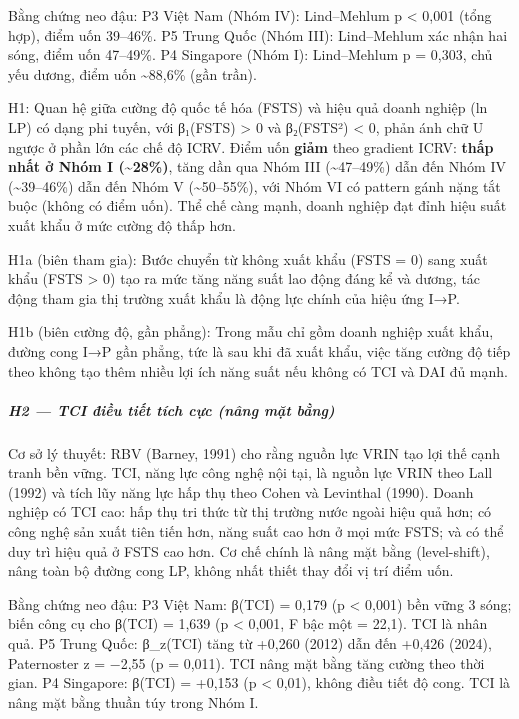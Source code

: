 \documentclass[12pt,a4paper]{article}
\begin{document}
Bằng chứng neo đậu: P3 Việt Nam (Nhóm IV): Lind--Mehlum p \textless{}
0,001 (tổng hợp), điểm uốn 39--46\%. P5 Trung Quốc (Nhóm III):
Lind--Mehlum xác nhận hai sóng, điểm uốn 47--49\%. P4 Singapore (Nhóm
I): Lind--Mehlum p = 0,303, chủ yếu dương, điểm uốn
\textasciitilde88,6\% (gần trần).

H1: Quan hệ giữa cường độ quốc tế hóa (FSTS) và hiệu quả doanh nghiệp
(ln LP) có dạng phi tuyến, với β₁(FSTS) \textgreater{} 0 và β₂(FSTS²)
\textless{} 0, phản ánh chữ U ngược ở phần lớn các chế độ ICRV. Điểm uốn
\textbf{giảm} theo gradient ICRV: \textbf{thấp nhất ở Nhóm I
(\textasciitilde28\%)}, tăng dần qua Nhóm III (\textasciitilde47--49\%)
dẫn đến Nhóm IV (\textasciitilde39--46\%) dẫn đến Nhóm V
(\textasciitilde50--55\%), với Nhóm VI có pattern gánh nặng tắt buộc
(không có điểm uốn). Thể chế càng mạnh, doanh nghiệp đạt đỉnh hiệu suất
xuất khẩu ở mức cường độ thấp hơn.

H1a (biên tham gia): Bước chuyển từ không xuất khẩu (FSTS = 0) sang xuất
khẩu (FSTS \textgreater{} 0) tạo ra mức tăng năng suất lao động đáng kể
và dương, tác động tham gia thị trường xuất khẩu là động lực chính của
hiệu ứng I→P.

H1b (biên cường độ, gần phẳng): Trong mẫu chỉ gồm doanh nghiệp xuất
khẩu, đường cong I→P gần phẳng, tức là sau khi đã xuất khẩu, việc tăng
cường độ tiếp theo không tạo thêm nhiều lợi ích năng suất nếu không có
TCI và DAI đủ mạnh.

\hypertarget{h2--tci-ux111iux1ec1u-tiux1ebft-tuxedch-cux1ef1c-nuxe2ng-mux1eb7t-bux1eb1ng}{%
\subparagraph{H2 --- TCI điều tiết tích cực (nâng mặt
bằng)}\label{h2--tci-ux111iux1ec1u-tiux1ebft-tuxedch-cux1ef1c-nuxe2ng-mux1eb7t-bux1eb1ng}}

Cơ sở lý thuyết: RBV (Barney, 1991) cho rằng nguồn lực VRIN tạo lợi thế
cạnh tranh bền vững. TCI, năng lực công nghệ nội tại, là nguồn lực VRIN
theo Lall (1992) và tích lũy năng lực hấp thụ theo Cohen và Levinthal
(1990). Doanh nghiệp có TCI cao: hấp thụ tri thức từ thị trường nước
ngoài hiệu quả hơn; có công nghệ sản xuất tiên tiến hơn, năng suất cao
hơn ở mọi mức FSTS; và có thể duy trì hiệu quả ở FSTS cao hơn. Cơ chế
chính là nâng mặt bằng (level-shift), nâng toàn bộ đường cong LP, không
nhất thiết thay đổi vị trí điểm uốn.

Bằng chứng neo đậu: P3 Việt Nam: β(TCI) = 0,179 (p \textless{} 0,001)
bền vững 3 sóng; biến công cụ cho β(TCI) = 1,639 (p \textless{} 0,001, F
bậc một = 22,1). TCI là nhân quả. P5 Trung Quốc: β\_z(TCI) tăng từ
+0,260 (2012) dẫn đến +0,426 (2024), Paternoster z = −2,55 (p = 0,011).
TCI nâng mặt bằng tăng cường theo thời gian. P4 Singapore: β(TCI) =
+0,153 (p \textless{} 0,01), không điều tiết độ cong. TCI là nâng mặt
bằng thuần túy trong Nhóm I.
\end{document}
